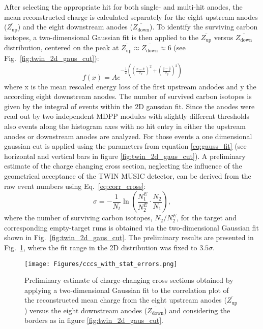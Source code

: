 After selecting the appropriate hit for both single- and multi-hit anodes, the mean reconstructed charge is calculated separately for the eight upstream anodes ($\overline{Z_{\text{up}}}$) and the eight downstream anodes ($\overline{Z_{\text{down}}}$). To identify the surviving carbon isotopes, a two-dimensional Gaussian fit is then applied to the $\overline{Z_{\text{up}}}$ versus $\overline{Z_{\text{down}}}$ distribution, centered on the peak at $\overline{Z_{\text{up}}} \approx \overline{Z_{\text{down}}} \approx 6$ (see Fig.~\ref{fig:twin_2d_gaus_cut}):
\begin{equation}
f(x) = A e^{-\frac{1}{2}((\frac{x - \bar{x}}{\sigma_{x}})^2 +(\frac{y - \bar{y}}{\sigma_{y}})^2)}
\label{eq:gauss_fit}
\end{equation}
where x is the mean rescaled energy loss of the first upstream andodes and y the according eight downstream anodes. The number of survived carbon isotopes is given by the integral of events within the 2D gaussian fit. Since the anodes were read out by two independent MDPP modules with slightly different thresholds also events along the histogram axes with no hit entry in either the upstream anodes or downstream anodes are analyzed. For those events a one dimensional gaussian cut is applied using the parameters from equation \ref{eq:gauss_fit} (see horizontal and vertical bars in figure \ref{fig:twin_2d_gaus_cut}).\newline
A preliminary estimate of the charge changing cross section, neglecting the influence of the geometrical acceptance of the TWIN MUSIC detector, can be derived from the raw event numbers using Eq.~\ref{eq:corr_cross}:
\[
    \sigma = -\frac{1}{N_t} \ln\left(\frac{N_1^E}{N_2^E} \cdot \frac{N_2}{N_1}\right),
\]
where the number of surviving carbon isotopes, $N_2/N_2^E$, for the target and corresponding empty-target runs is obtained via the two-dimensional Gaussian fit shown in Fig.~\ref{fig:twin_2d_gaus_cut}. The preliminary results are presented in Fig.~\ref{fig:cccs_gaus_with_errors}, where the fit range in the 2D distribution was fixed to $3.5\sigma$.

\begin{figure}[htpb]
    \centering
    \texttt{[image: Figures/cccs\_with\_stat\_errors.png]}
    \caption{
    Preliminary estimate of charge-changing cross sections obtained by applying a two-dimensional Gaussian fit to the correlation plot of the reconstructed mean charge from the eight upstream anodes ($\overline{Z_{\text{up}}}$) versus the eight downstream anodes ($\overline{Z_{\text{down}}}$) and considering the borders as in figure \ref{fig:twin_2d_gaus_cut}.
     }
    \label{fig:cccs_gaus_with_errors}
\end{figure}

